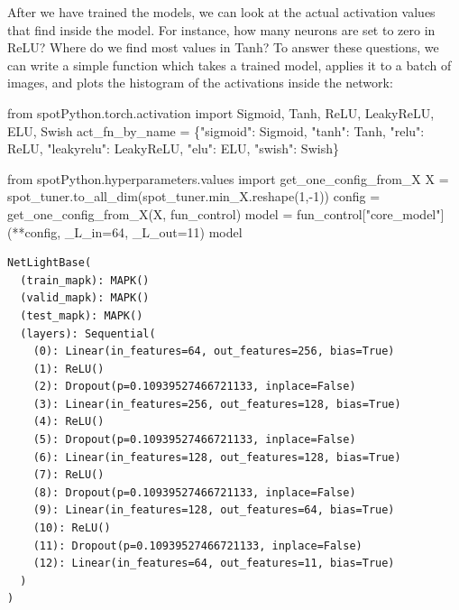 \documentclass[
  letterpaper,
  DIV=11,
  numbers=noendperiod]{scrreprt}
\newenvironment{Shaded}{\begin{snugshade}}{\end{snugshade}}
\newcommand{\DecValTok}[1]{\textcolor[rgb]{0.68,0.00,0.00}{#1}}
\newcommand{\ImportTok}[1]{\textcolor[rgb]{0.00,0.46,0.62}{#1}}
\newcommand{\NormalTok}[1]{\textcolor[rgb]{0.00,0.23,0.31}{#1}}
\newcommand{\OperatorTok}[1]{\textcolor[rgb]{0.37,0.37,0.37}{#1}}
\newcommand{\StringTok}[1]{\textcolor[rgb]{0.13,0.47,0.30}{#1}}
\begin{document}
After we have trained the models, we can look at the actual activation
values that find inside the model. For instance, how many neurons are
set to zero in ReLU? Where do we find most values in Tanh? To answer
these questions, we can write a simple function which takes a trained
model, applies it to a batch of images, and plots the histogram of the
activations inside the network:

\begin{Shaded}
\begin{Highlighting}[]
\ImportTok{from}\NormalTok{ spotPython.torch.activation }\ImportTok{import}\NormalTok{ Sigmoid, Tanh, ReLU, LeakyReLU, ELU, Swish}
\NormalTok{act\_fn\_by\_name }\OperatorTok{=}\NormalTok{ \{}\StringTok{"sigmoid"}\NormalTok{: Sigmoid, }\StringTok{"tanh"}\NormalTok{: Tanh, }\StringTok{"relu"}\NormalTok{: ReLU, }\StringTok{"leakyrelu"}\NormalTok{: LeakyReLU, }\StringTok{"elu"}\NormalTok{: ELU, }\StringTok{"swish"}\NormalTok{: Swish\}}
\end{Highlighting}
\end{Shaded}

\begin{Shaded}
\begin{Highlighting}[]
\ImportTok{from}\NormalTok{ spotPython.hyperparameters.values }\ImportTok{import}\NormalTok{ get\_one\_config\_from\_X}
\NormalTok{X }\OperatorTok{=}\NormalTok{ spot\_tuner.to\_all\_dim(spot\_tuner.min\_X.reshape(}\DecValTok{1}\NormalTok{,}\OperatorTok{{-}}\DecValTok{1}\NormalTok{))}
\NormalTok{config }\OperatorTok{=}\NormalTok{ get\_one\_config\_from\_X(X, fun\_control)}
\NormalTok{model }\OperatorTok{=}\NormalTok{ fun\_control[}\StringTok{"core\_model"}\NormalTok{](}\OperatorTok{**}\NormalTok{config, \_L\_in}\OperatorTok{=}\DecValTok{64}\NormalTok{, \_L\_out}\OperatorTok{=}\DecValTok{11}\NormalTok{)}
\NormalTok{model}
\end{Highlighting}
\end{Shaded}

\begin{verbatim}
NetLightBase(
  (train_mapk): MAPK()
  (valid_mapk): MAPK()
  (test_mapk): MAPK()
  (layers): Sequential(
    (0): Linear(in_features=64, out_features=256, bias=True)
    (1): ReLU()
    (2): Dropout(p=0.10939527466721133, inplace=False)
    (3): Linear(in_features=256, out_features=128, bias=True)
    (4): ReLU()
    (5): Dropout(p=0.10939527466721133, inplace=False)
    (6): Linear(in_features=128, out_features=128, bias=True)
    (7): ReLU()
    (8): Dropout(p=0.10939527466721133, inplace=False)
    (9): Linear(in_features=128, out_features=64, bias=True)
    (10): ReLU()
    (11): Dropout(p=0.10939527466721133, inplace=False)
    (12): Linear(in_features=64, out_features=11, bias=True)
  )
)
\end{verbatim}
\end{document}
